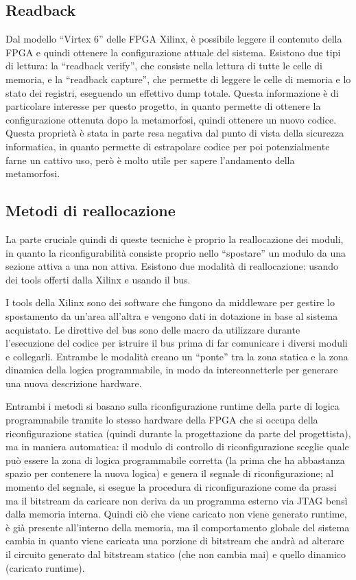 \documentclass[11pt]{article} %
\begin{document}
\subsection{Readback}

Dal modello ``Virtex 6'' delle FPGA Xilinx, è possibile leggere il contenuto della FPGA e quindi ottenere la configurazione attuale del sistema. Esistono due tipi di lettura: la ``readback verify'', che consiste nella lettura di tutte le celle di memoria, e la ``readback capture'', che permette di leggere le celle di memoria e lo stato dei registri, eseguendo un effettivo dump totale. Questa informazione è di particolare interesse per questo progetto, in quanto permette di ottenere la configurazione ottenuta dopo la metamorfosi, quindi ottenere un nuovo codice. Questa proprietà è stata in parte resa negativa dal punto di vista della sicurezza informatica, in quanto permette di estrapolare codice per poi potenzialmente farne un cattivo uso, però è molto utile per sapere l'andamento della metamorfosi.

\subsection{Metodi di reallocazione}

La parte cruciale quindi di queste tecniche è proprio la reallocazione dei moduli, in quanto la riconfigurabilità consiste proprio nello ``spostare'' un modulo da una sezione attiva a una non attiva. Esistono due modalità di reallocazione: usando dei tools offerti dalla Xilinx e usando il bus.

I tools della Xilinx sono dei software che fungono da middleware per gestire lo spostamento da un'area all'altra e vengono dati in dotazione in base al sistema acquistato. Le direttive del bus sono delle macro da utilizzare durante l'esecuzione del codice per istruire il bus prima di far comunicare i diversi moduli e collegarli. Entrambe le modalità creano un ``ponte'' tra la zona statica e la zona dinamica della logica programmabile, in modo da interconnetterle per generare una nuova descrizione hardware.

Entrambi i metodi si basano sulla riconfigurazione runtime della parte di logica programmabile tramite lo stesso hardware della FPGA che si occupa della riconfigurazione statica (quindi durante la progettazione da parte del progettista), ma in maniera automatica: il modulo di controllo di riconfigurazione sceglie quale può essere la zona di logica programmabile corretta (la prima che ha abbastanza spazio per contenere la nuova logica) e genera il segnale di riconfigurazione; al momento del segnale, si esegue la procedura di riconfigurazione come da prassi ma il bitstream da caricare non deriva da un programma esterno via JTAG bensì dalla memoria interna. Quindi ciò che viene caricato non viene generato runtime, è già presente all'interno della memoria, ma il comportamento globale del sistema cambia in quanto viene caricata una porzione di bitstream che andrà ad alterare il circuito generato dal bitstream statico (che non cambia mai) e quello dinamico (caricato runtime).
\end{document}
